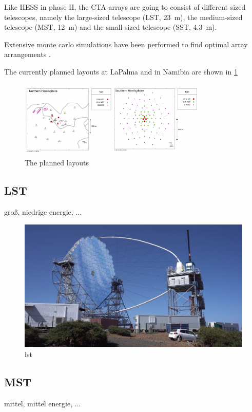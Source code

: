 Like HESS in phase II, the CTA arrays are going to consist of different sized telescopes, namely
the large-sized telescope (LST, \SI{23}{\meter}), 
the medium-sized telescope (MST, \SI{12}{\meter}) 
and the small-sized telescope (SST, \SI{4.3}{\meter}).

Extensive monte carlo simulations have been performed to find optimal array arrangements
\cite{BERNLOHR2013171}.

The currently planned layouts at LaPalma and in Namibia are shown in 
\ref{fig:cta_layout}

\begin{figure}
	\center
	\includegraphics[width=0.8\textwidth]{images/cta_layout.png}
	\caption{The planned layouts \cite{cta_web}}
	\label{fig:cta_layout}
\end{figure}


\subsection{LST}
groß, niedrige energie, ...

\begin{figure}
	\center
	\includegraphics[width=.8\textwidth]{images/lst.jpeg}
	\caption{lst \cite{cta_web}}
	\label{fig:lst}
\end{figure}

\subsection{MST}
mittel, mittel energie, ...

